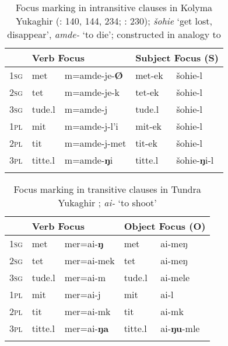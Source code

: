 \begin{table}
\caption{Focus marking in intransitive clauses in Kolyma Yukaghir (\citealt{Maslova2003a}: 140, 144, 234; \citealt{Nagasaki2011}: 230); \textit{šohie} ‘get lost, disappear’, \textit{amde-} ‘to die’; constructed in analogy to }
\label{tab:yuka:3}
\begin{tabularx}{\textwidth}{X ll@{\hspace*{3cm}}ll}
\lsptoprule
& \multicolumn{2}{l}{Verb Focus} & \multicolumn{2}{c}{Subject Focus (S)}\\
\midrule
1\textsc{sg} & met & m=amde-je-\textbf{Ø} & met-ek & šohie-l\\
2\textsc{sg} & tet & m=amde-je-k & tet-ek & šohie-l\\
3\textsc{sg} & tude.l & m=amde-j & tude.l & šohie-l\\
1\textsc{pl} & mit & m=amde-j-l’i & mit-ek & šohie-l\\
2\textsc{pl} & tit & m=amde-j-met & tit-ek & šohie-l\\
3\textsc{pl} & titte.l & m=amde-\textbf{ŋ}i & titte.l & šohie-\textbf{ŋ}i-l\\
\lspbottomrule
\end{tabularx}
\end{table}

\begin{table}
\caption{Focus marking in transitive clauses in Tundra Yukaghir \citep[56]{Schmalz2012}; \textit{ai-} ‘to shoot’}
\label{tab:yuka:4}
\begin{tabularx}{\textwidth}{X ll@{\hspace*{3cm}}ll}
\lsptoprule
& \multicolumn{2}{l}{Verb Focus} & \multicolumn{2}{l}{Object Focus (O)}\\
\midrule
1\textsc{sg} & met & mer=ai-\textbf{ŋ} & met & ai-meŋ\\
2\textsc{sg} & tet & mer=ai-mek & tet & ai-meŋ\\
3\textsc{sg} & tude.l & mer=ai-m & tude.l & ai-mele\\
1\textsc{pl} & mit & mer=ai-j & mit & ai-l\\
2\textsc{pl} & tit & mer=ai-mk & tit & ai-mk\\
3\textsc{pl} & titte.l & mer=ai-\textbf{ŋa} & titte.l & ai-\textbf{ŋu}-mle\\
\lspbottomrule
\end{tabularx}
\end{table}

